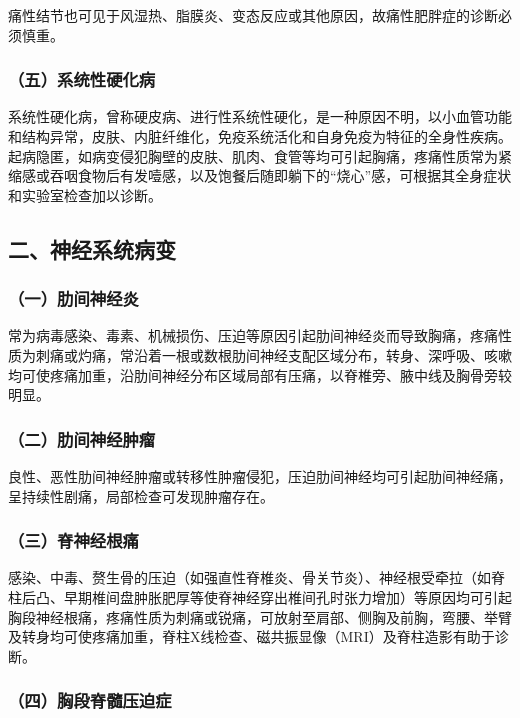 痛性结节也可见于风湿热、脂膜炎、变态反应或其他原因，故痛性肥胖症的诊断必须慎重。

\subsubsection{（五）系统性硬化病}

系统性硬化病，曾称硬皮病、进行性系统性硬化，是一种原因不明，以小血管功能和结构异常，皮肤、内脏纤维化，免疫系统活化和自身免疫为特征的全身性疾病。起病隐匿，如病变侵犯胸壁的皮肤、肌肉、食管等均可引起胸痛，疼痛性质常为紧缩感或吞咽食物后有发噎感，以及饱餐后随即躺下的“烧心”感，可根据其全身症状和实验室检查加以诊断。

\subsection{二、神经系统病变}

\subsubsection{（一）肋间神经炎}

常为病毒感染、毒素、机械损伤、压迫等原因引起肋间神经炎而导致胸痛，疼痛性质为刺痛或灼痛，常沿着一根或数根肋间神经支配区域分布，转身、深呼吸、咳嗽均可使疼痛加重，沿肋间神经分布区域局部有压痛，以脊椎旁、腋中线及胸骨旁较明显。

\subsubsection{（二）肋间神经肿瘤}

良性、恶性肋间神经肿瘤或转移性肿瘤侵犯，压迫肋间神经均可引起肋间神经痛，呈持续性剧痛，局部检查可发现肿瘤存在。

\subsubsection{（三）脊神经根痛}

感染、中毒、赘生骨的压迫（如强直性脊椎炎、骨关节炎）、神经根受牵拉（如脊柱后凸、早期椎间盘肿胀肥厚等使脊神经穿出椎间孔时张力增加）等原因均可引起胸段神经根痛，疼痛性质为刺痛或锐痛，可放射至肩部、侧胸及前胸，弯腰、举臂及转身均可使疼痛加重，脊柱X线检查、磁共振显像（MRI）及脊柱造影有助于诊断。

\subsubsection{（四）胸段脊髓压迫症}

